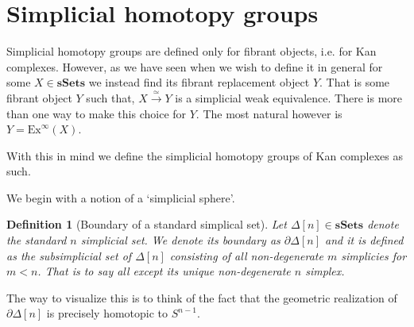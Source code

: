 \documentclass[12pt]{report}
\numberwithin{equation}{section}
\newtheorem{definition}[dummy]{Definition}
\begin{document}
	
	
	\section{Simplicial homotopy groups}
	
	Simplicial homotopy groups are defined only for fibrant objects, i.e. for Kan complexes. However, as we have seen when we wish to define it in general for some \( X \in \mathbf{sSets} \) we instead find its fibrant replacement object \( Y \). That is some fibrant object \( Y \) such that, \( X \xrightarrow{\simeq} Y \) is a simplicial weak equivalence. There is more than one way to make this choice for \( Y \). The most natural however is \(Y= \mathrm{Ex}^\infty (X) \).
	
	With this in mind we define the simplicial homotopy groups of Kan complexes as such.
	
	We begin with a notion of a `simplicial sphere'.
	\begin{definition}[Boundary of a standard simplical set]
		Let \( \Delta[n]\in \mathbf{sSets} \) denote the standard \( n \) simplicial set. We denote its boundary as \( \partial \Delta[n] \) and it is defined as the subsimplicial set of \( \Delta[n] \) consisting of all non-degenerate \( m \) simplicies for \( m <n \). That is to say all except its unique non-degenerate  \( n \) simplex.
	\end{definition}
	
	The way to visualize this is to think of the fact that the geometric realization of \( \partial \Delta[n] \) is precisely homotopic to \( S^{n-1} \).
	
\end{document}
